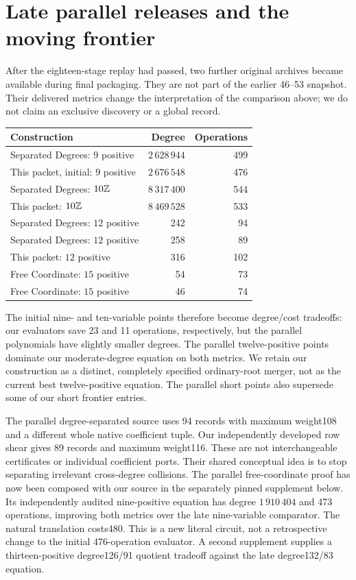 \section{Late parallel releases and the moving frontier}
After the eighteen-stage replay had passed, two further original archives
became available during final packaging. They are not part of the earlier
46--53 snapshot. Their delivered metrics change the interpretation of the
comparison above; we do not claim an exclusive discovery or a global record.
\begin{center}\small
\begin{tabular}{@{}lrr@{}}\toprule
Construction & Degree & Operations\\\midrule
Separated Degrees: $9$ positive & $2\,628\,944$ &499\\
This packet, initial: $9$ positive & $2\,676\,548$ &476\\
Separated Degrees: $10\mathbb Z$ & $8\,317\,400$ &544\\
This packet: $10\mathbb Z$ & $8\,469\,528$ &533\\
Separated Degrees: $12$ positive &242&94\\
Separated Degrees: $12$ positive &258&89\\
This packet: $12$ positive &316&102\\
Free Coordinate: $15$ positive &54&73\\
Free Coordinate: $15$ positive &46&74\\\bottomrule
\end{tabular}
\end{center}
The initial nine- and ten-variable points therefore become degree/cost tradeoffs:
our evaluators save 23 and 11 operations, respectively, but the parallel
polynomials have slightly smaller degrees. The parallel twelve-positive
points dominate our moderate-degree equation on both metrics. We retain
our construction as a distinct, completely specified ordinary-root merger,
not as the current best twelve-positive equation. The parallel short points
also supersede some of our short frontier entries.

The parallel degree-separated source uses 94 records with maximum weight108
and a different whole native coefficient tuple. Our independently developed
row shear gives 89 records and maximum weight116. These are not interchangeable
certificates or individual coefficient ports. Their shared conceptual idea
is to stop separating irrelevant cross-degree collisions. The parallel
free-coordinate proof has now been composed with our source in the separately
pinned supplement below. Its independently audited nine-positive equation
has degree $1\,910\,404$ and 473 operations, improving both metrics over
the late nine-variable comparator. The natural translation costs480.
This is a new literal circuit, not a retrospective change to the initial
476-operation evaluator. A second supplement supplies a thirteen-positive
degree126/91 quotient tradeoff against the late degree132/83 equation.

